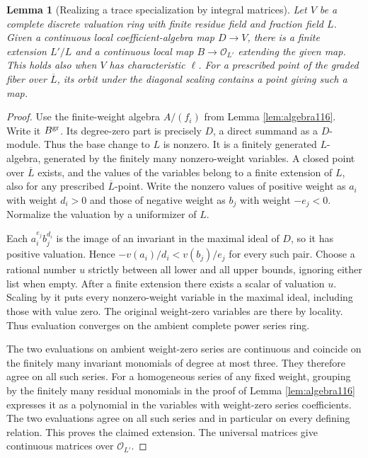 \documentclass[a4paper,11pt]{article}
\newtheorem{lemma}[proposition]{Lemma}
\theoremstyle{definition}
\theoremstyle{remark}
\numberwithin{equation}{section}
\begin{document}
\begin{lemma}[Realizing a trace specialization by integral matrices]
\label{lem:scale118}
Let \(V\) be a complete discrete valuation ring with finite
residue field and fraction field \(L\). Given a continuous local
coefficient-algebra map \(D\to V\), there is a finite extension
\(L'/L\) and a continuous local map \(B\to\mathcal O_{L'}\)
extending the given map. This holds also when \(V\) has
characteristic \(\ell\). For a prescribed point of the graded
fiber over \(\overline L\), its orbit under the diagonal scaling
contains a point giving such a map.
\end{lemma}
\begin{proof}
Use the finite-weight algebra \(A/(f_i)\) from
Lemma \ref{lem:algebra116}.
Write it \(B^{\rm gr}\). Its degree-zero part is precisely \(D\),
a direct summand as a \(D\)-module. Thus the base change to \(L\)
is nonzero. It is a finitely generated \(L\)-algebra, generated
by the finitely many nonzero-weight variables. A closed point
over \(\overline L\) exists, and the values of the variables
belong to a finite extension of \(L\), also for any prescribed
\(\overline L\)-point. Write the nonzero values of positive
weight as \(a_i\) with weight \(d_i>0\) and those of negative
weight as \(b_j\) with weight \(-e_j<0\). Normalize the
valuation by a uniformizer of \(L\).

Each \(a_i^{e_j} b_j^{d_i}\) is the image of an invariant in the
maximal ideal of \(D\), so it has positive valuation. Hence
\(-v(a_i)/d_i < v(b_j)/e_j\) for every such pair. Choose a
rational number \(u\) strictly between all lower and all upper
bounds, ignoring either list when empty. After a finite extension
there exists a scalar of valuation \(u\). Scaling by it puts
every nonzero-weight variable in the maximal ideal, including
those with value zero. The original weight-zero variables are there
by locality. Thus evaluation converges on the ambient complete
power series ring.

The two evaluations on ambient weight-zero series are continuous
and coincide on the finitely many invariant monomials of degree
at most three. They therefore agree on all such series.
For a homogeneous series of any fixed weight, grouping
by the finitely many residual monomials in the proof of Lemma \ref{lem:algebra116} expresses it as a polynomial in the variables with
weight-zero series coefficients. The two evaluations agree on
all such series and in particular on every defining relation.
This proves the claimed extension. The universal matrices give
continuous matrices over \(\mathcal O_{L'}\).
\end{proof}
\end{document}
